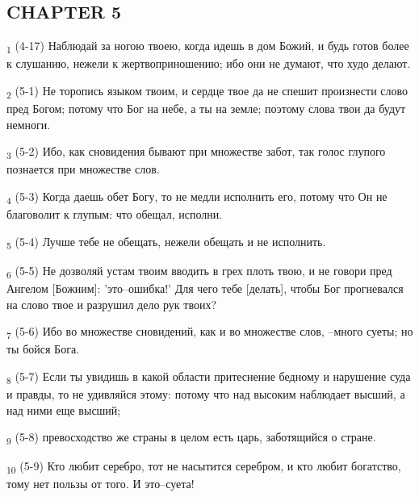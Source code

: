 \subsection{CHAPTER 5}
\begin{tcolorbox}
\textsubscript{1} (4-17) Наблюдай за ногою твоею, когда идешь в дом Божий, и будь готов более к слушанию, нежели к жертвоприношению; ибо они не думают, что худо делают.
\end{tcolorbox}
\begin{tcolorbox}
\textsubscript{2} (5-1) Не торопись языком твоим, и сердце твое да не спешит произнести слово пред Богом; потому что Бог на небе, а ты на земле; поэтому слова твои да будут немноги.
\end{tcolorbox}
\begin{tcolorbox}
\textsubscript{3} (5-2) Ибо, как сновидения бывают при множестве забот, так голос глупого познается при множестве слов.
\end{tcolorbox}
\begin{tcolorbox}
\textsubscript{4} (5-3) Когда даешь обет Богу, то не медли исполнить его, потому что Он не благоволит к глупым: что обещал, исполни.
\end{tcolorbox}
\begin{tcolorbox}
\textsubscript{5} (5-4) Лучше тебе не обещать, нежели обещать и не исполнить.
\end{tcolorbox}
\begin{tcolorbox}
\textsubscript{6} (5-5) Не дозволяй устам твоим вводить в грех плоть твою, и не говори пред Ангелом [Божиим]: 'это--ошибка!' Для чего тебе [делать], чтобы Бог прогневался на слово твое и разрушил дело рук твоих?
\end{tcolorbox}
\begin{tcolorbox}
\textsubscript{7} (5-6) Ибо во множестве сновидений, как и во множестве слов, --много суеты; но ты бойся Бога.
\end{tcolorbox}
\begin{tcolorbox}
\textsubscript{8} (5-7) Если ты увидишь в какой области притеснение бедному и нарушение суда и правды, то не удивляйся этому: потому что над высоким наблюдает высший, а над ними еще высший;
\end{tcolorbox}
\begin{tcolorbox}
\textsubscript{9} (5-8) превосходство же страны в целом есть царь, заботящийся о стране.
\end{tcolorbox}
\begin{tcolorbox}
\textsubscript{10} (5-9) Кто любит серебро, тот не насытится серебром, и кто любит богатство, тому нет пользы от того. И это--суета!
\end{tcolorbox}

